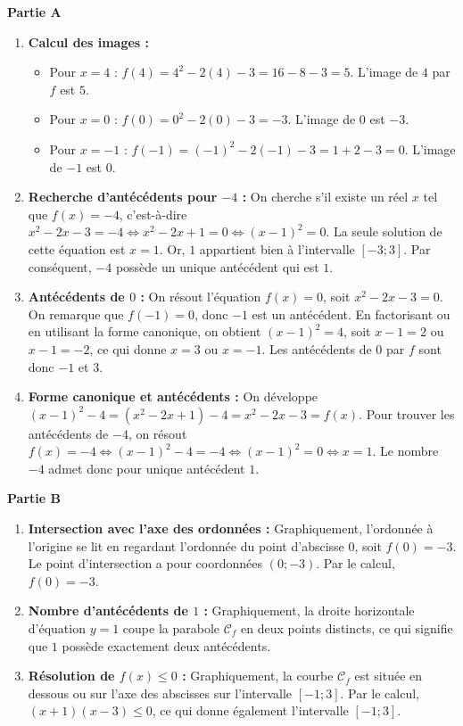 \documentclass[11pt,a4paper]{article}
\newcommand{\partie}[1]{%
  \vspace{0.9em}%
  \noindent\textbf{#1}%
  \par\vspace{0.3em}%
}
\begin{document}
\partie{Partie A}
\begin{enumerate}
  \item \textbf{Calcul des images :}
  \begin{itemize}
    \item Pour $x = 4$ : $f(4) = 4^2 - 2(4) - 3 = 16 - 8 - 3 = 5$. L'image de $4$ par $f$ est $5$.
    \item Pour $x = 0$ : $f(0) = 0^2 - 2(0) - 3 = -3$. L'image de $0$ est $-3$.
    \item Pour $x = -1$ : $f(-1) = (-1)^2 - 2(-1) - 3 = 1 + 2 - 3 = 0$. L'image de $-1$ est $0$.
  \end{itemize}
  \item \textbf{Recherche d'antécédents pour $-4$ :}
  On cherche s'il existe un réel $x$ tel que $f(x) = -4$, c'est-à-dire $x^2 - 2x - 3 = -4 \iff x^2 - 2x + 1 = 0 \iff (x-1)^2 = 0$.
  La seule solution de cette équation est $x = 1$. Or, $1$ appartient bien à l'intervalle $[-3 ; 3]$. Par conséquent, $-4$ possède un unique antécédent qui est $1$.
  \item \textbf{Antécédents de $0$ :}
  On résout l'équation $f(x) = 0$, soit $x^2 - 2x - 3 = 0$.
  On remarque que $f(-1) = 0$, donc $-1$ est un antécédent.
  En factorisant ou en utilisant la forme canonique, on obtient $(x-1)^2 = 4$, soit $x-1 = 2$ ou $x-1 = -2$, ce qui donne $x = 3$ ou $x = -1$.
  Les antécédents de $0$ par $f$ sont donc $-1$ et $3$.
  \item \textbf{Forme canonique et antécédents :}
  On développe $(x-1)^2 - 4 = (x^2 - 2x + 1) - 4 = x^2 - 2x - 3 = f(x)$.
  Pour trouver les antécédents de $-4$, on résout $f(x) = -4 \iff (x-1)^2 - 4 = -4 \iff (x-1)^2 = 0 \iff x = 1$.
  Le nombre $-4$ admet donc pour unique antécédent $1$.
\end{enumerate}

\partie{Partie B}
\begin{enumerate}
  \item \textbf{Intersection avec l'axe des ordonnées :}
  Graphiquement, l'ordonnée à l'origine se lit en regardant l'ordonnée du point d'abscisse $0$, soit $f(0) = -3$. Le point d'intersection a pour coordonnées $(0 ; -3)$. Par le calcul, $f(0) = -3$.
  \item \textbf{Nombre d'antécédents de $1$ :}
  Graphiquement, la droite horizontale d'équation $y = 1$ coupe la parabole $\mathcal{C}_f$ en deux points distincts, ce qui signifie que $1$ possède exactement deux antécédents.
  \item \textbf{Résolution de $f(x) \leqslant 0$ :}
  Graphiquement, la courbe $\mathcal{C}_f$ est située en dessous ou sur l'axe des abscisses sur l'intervalle $[-1 ; 3]$.
  Par le calcul, $(x+1)(x-3) \leqslant 0$, ce qui donne également l'intervalle $[-1 ; 3]$.
\end{enumerate}
\end{document}
